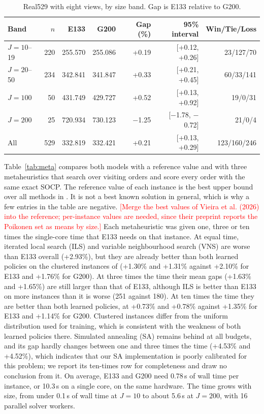 \documentclass[preprint,12pt,authoryear]{elsarticle}
\newcommand{\placeholder}[1]{\textcolor{red}{[#1]}}
\begin{document}
\begin{table}[t]
\centering
\caption{Real529 with eight views, by size band. Gap is E133 relative to G200.}
\label{tab:real}
\small
\begin{tabular}{lrrrrrr}
\toprule
Band & $n$ & E133 & G200 & Gap (\%) & 95\% interval & Win/Tie/Loss \\
\midrule
$J = 10$--19 & 220 & 255.570 & 255.086 & +0.19 & [+0.12, +0.26] & 23/127/70 \\
$J = 20$--50 & 234 & 342.841 & 341.847 & +0.33 & [+0.21, +0.45] & 60/33/141 \\
$J = 100$ & 50 & 431.749 & 429.727 & +0.52 & [+0.13, +0.92] & 19/0/31 \\
$J = 200$ & 25 & 720.934 & 730.123 & $-$1.25 & [$-$1.78, $-$0.72] & 21/0/4 \\
All & 529 & 332.819 & 332.421 & +0.21 & [+0.13, +0.29] & 123/160/246 \\
\bottomrule
\end{tabular}
\end{table}

Table~\ref{tab:meta} compares both models with a reference value and with three metaheuristics that search over visiting orders and score every order with the same exact SOCP. The reference value of each instance is the best upper bound over all methods in \citet{li2025}. It is not a best known solution in general, which is why a few entries in the table are negative. \placeholder{Merge the best values of Vieira et al. (2026) into the reference; per-instance values are needed, since their preprint reports the Poikonen set as means by size.} Each metaheuristic was given one, three or ten times the single-core time that E133 needs on that instance. At equal time, iterated local search (ILS) and variable neighbourhood search (VNS) are worse than E133 overall (+2.93\%), but they are already better than both learned policies on the clustered instances of \citet{poikonen2020} (+1.30\% and +1.31\% against +2.10\% for E133 and +1.76\% for G200). At three times the time their mean gaps (+1.63\% and +1.65\%) are still larger than that of E133, although ILS is better than E133 on more instances than it is worse (251 against 180). At ten times the time they are better than both learned policies, at +0.73\% and +0.78\% against +1.35\% for E133 and +1.14\% for G200. Clustered instances differ from the uniform distribution used for training, which is consistent with the weakness of both learned policies there. Simulated annealing (SA) remains behind at all budgets, and its gap hardly changes between one and three times the time (+4.53\% and +4.52\%), which indicates that our SA implementation is poorly calibrated for this problem; we report its ten-times row for completeness and draw no conclusion from it. On average, E133 and G200 need 0.78\,s of wall time per instance, or 10.3\,s on a single core, on the same hardware. The time grows with size, from under 0.1\,s of wall time at $J = 10$ to about 5.6\,s at $J = 200$, with 16 parallel solver workers.
\end{document}
